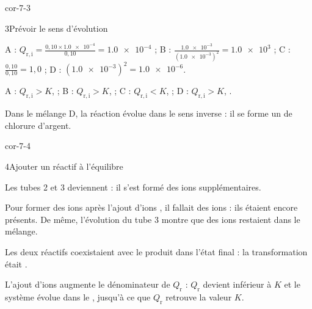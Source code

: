 \begin{blocLivre}{cor-7-3}
\begin{corrige}{3}{Prévoir le sens d'évolution}
\begin{questions}
\item A : $Q_{\mathrm{r},\mathrm{i}}=\frac{0{,}10\times\num{1.0e-4}}{0{,}10}=\num{1.0e-4}$ ; B : $\frac{\num{1.0e-3}}{(\num{1.0e-3})^2}=\num{1.0e3}$ ;
C : $\frac{0{,}10}{0{,}10}=1{,}0$ ; D : \mbox{$(\num{1.0e-3})^2=\num{1.0e-6}$}.
\item A : $Q_{\mathrm{r},\mathrm{i}}>K$,  ; B : $Q_{\mathrm{r},\mathrm{i}}>K$,  ;
C : $Q_{\mathrm{r},\mathrm{i}}<K$,  ; D : $Q_{\mathrm{r},\mathrm{i}}>K$, .
\item Dans le mélange D, la réaction évolue dans le sens inverse : il se forme un  de
chlorure d'argent.
\end{questions}
\end{corrige}
\end{blocLivre}
\begin{blocLivre}{cor-7-4}
\begin{corrige}{4}{Ajouter un réactif à l'équilibre}
\begin{questions}
\item Les tubes 2 et 3 deviennent  : il s'est formé des ions  supplémentaires.
\item Pour former des ions  après l'ajout d'ions , il fallait des ions  : ils étaient
encore présents. De même, l'évolution du tube 3 montre que des ions  restaient dans le mélange.
\item Les deux réactifs coexistaient avec le produit dans l'état final : la transformation était .
\item L'ajout d'ions  augmente le dénominateur de $Q_\mathrm{r}$ : $Q_\mathrm{r}$ devient inférieur à $K$ et le
système évolue dans le , jusqu'à ce que $Q_\mathrm{r}$ retrouve la valeur $K$.
\end{questions}
\end{corrige}
\end{blocLivre}
